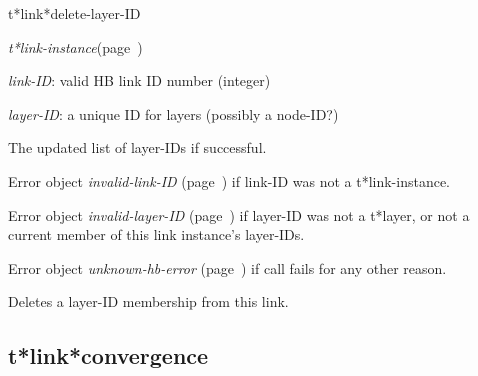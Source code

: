 \begin{description}
\item [Name:]  t*link*delete-layer-ID

\item [Class:] {\sl t*link-instance}\hfill(page~\pageref{t*link-instance})

\item [Parameters:]
\item {\sl link-ID}:  
valid HB link ID number (integer)

\item {\sl layer-ID}:  a unique ID for layers (possibly a node-ID?)

 

\item [Return-value:]
The updated list of layer-IDs if successful.

Error object {\sl invalid-link-ID} (page~\pageref{invalid-link-ID}) if link-ID was
not a t*link-instance.

Error object {\sl invalid-layer-ID} (page~\pageref{invalid-layer-ID}) if layer-ID was
not a t*layer, or not a current member of this link
instance's layer-IDs.

Error object {\sl unknown-hb-error} (page~\pageref{unknown-hb-error}) if call fails
for any other reason. 

\item [Description:]

Deletes a layer-ID membership from this link.

\item [Public:]



\end{description}
\horizontalline

\subsection{t*link*convergence}
\label{t*link*convergence}


